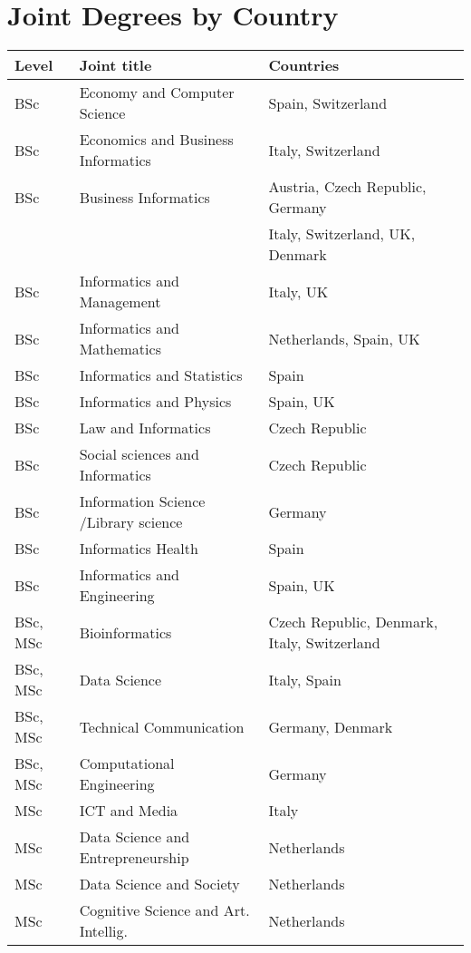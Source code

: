 \section{Joint Degrees by Country}\label{apx:teaching}
\small{
\begin{table}[h]
\begin{center}
\label{tab:unis}
\begin{tabular}  {|l|l|l|}
\hline
{\bf Level}&{\bf Joint title} & {\bf Countries}\\
\hline
BSc & Economy and Computer Science & Spain, Switzerland \\
\hline
BSc & Economics and Business Informatics & Italy, Switzerland \\
\hline
BSc & Business Informatics  &  Austria, Czech Republic, Germany \\
                                             &&Italy, Switzerland, UK, Denmark\\
\hline
BSc & Informatics and Management    & Italy,  UK \\
\hline
BSc & Informatics and Mathematics   & Netherlands, Spain, UK\\
\hline
BSc & Informatics and Statistics   & Spain\\
\hline
BSc & Informatics and Physics   & Spain, UK\\
\hline
BSc & Law and Informatics   &  Czech Republic\\
\hline
BSc & Social sciences and Informatics   & Czech Republic\\
\hline
BSc & Information Science /Library science   & Germany\\
\hline
BSc & Informatics Health  &Spain\\
\hline
BSc & Informatics and  Engineering   & Spain,  UK\\
\hline
BSc, MSc & Bioinformatics  & Czech Republic, Denmark, Italy, Switzerland\\
\hline
BSc, MSc & Data Science   & Italy, Spain\\
\hline
BSc, MSc & Technical Communication    & Germany, Denmark\\
\hline
BSc, MSc & Computational Engineering   & Germany\\
\hline
MSc & ICT and Media   & Italy\\
\hline
MSc & Data Science and Entrepreneurship   & Netherlands\\
\hline
MSc & Data Science and Society   & Netherlands\\
\hline
MSc & Cognitive Science and Art. Intellig.   & Netherlands\\

\end{tabular}
\end{center}
\end{table}}
